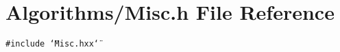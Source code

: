 \section{Algorithms/Misc.h File Reference}
\label{Misc_8h}
{\tt \#include \char`\"{}Misc.hxx\char`\"{}}\par
